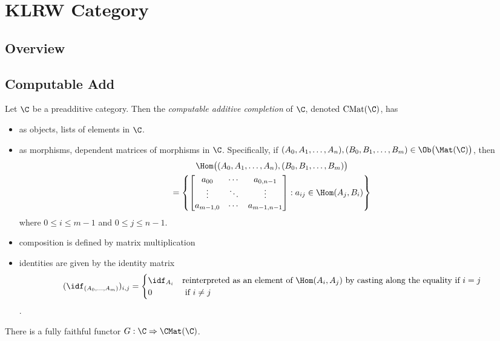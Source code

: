 
\chapter{KLRW Category}

\section{Overview}
\section{Computable Add}


\begin{definition}
 Let $\C$ be a preadditive category. Then the \emph{computable additive completion}
 of $\C$, denoted $\operatorname{CMat}(\C)$, has
 \begin{itemize}
  \item as objects, lists of elements in $\C$.
  \item as morphisms, dependent matrices of morphisms in $\C$.
  Specifically, if $(A_0, A_1, \ldots, A_n), (B_0, B_1, \ldots, B_m) \in \Ob\big(\Mat(\C)\big)$, then
\begin{multline*}
\Hom\big((A_0, A_1, \ldots, A_n), (B_0, B_1, \ldots, B_m)\big) \\
= \left\{
\begin{bmatrix}
  a_{00} & \cdots & a_{0,n-1} \\
  \vdots & \ddots & \vdots \\
  a_{m-1,0} & \cdots & a_{m-1,n-1}
\end{bmatrix}
: a_{ij} \in \Hom(A_j, B_i)
\right\}
\end{multline*}
where $0 \le i \le m-1$ and $0 \le j \le n-1$.

  \item composition is defined by matrix multiplication
  \item identities are given by the identity matrix
  $$ (\idf_{(A_0, \ldots, A_m)})_{i, j} = \begin{cases}
  \idf_{A_i} & \text{reinterpreted as an element of }\Hom(A_i, A_j)
  \text{ by casting along the equality if }i = j
  \\ 0 & \text{ if }i\ne j
  \end{cases}$$.
 \end{itemize}
\end{definition}
  There is a fully faithful functor $G: \C \Rightarrow \CMat(\C)$.

